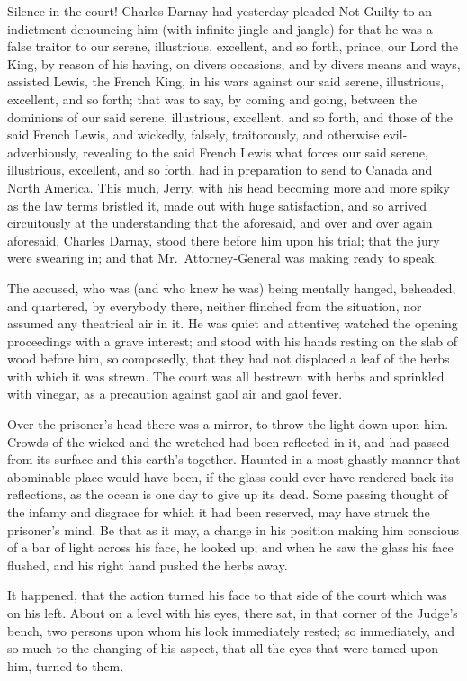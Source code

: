 Silence in the court!  Charles Darnay had yesterday pleaded Not Guilty
to an indictment denouncing him (with infinite jingle and jangle) for
that he was a false traitor to our serene, illustrious, excellent,
and so forth, prince, our Lord the King, by reason of his having, on
divers occasions, and by divers means and ways, assisted Lewis, the
French King, in his wars against our said serene, illustrious,
excellent, and so forth; that was to say, by coming and going,
between the dominions of our said serene, illustrious, excellent, and
so forth, and those of the said French Lewis, and wickedly, falsely,
traitorously, and otherwise evil-adverbiously, revealing to the said
French Lewis what forces our said serene, illustrious, excellent, and
so forth, had in preparation to send to Canada and North America.
This much, Jerry, with his head becoming more and more spiky as the
law terms bristled it, made out with huge satisfaction, and so
arrived circuitously at the understanding that the aforesaid, and
over and over again aforesaid, Charles Darnay, stood there before him
upon his trial; that the jury were swearing in; and that
Mr.\ Attorney-General was making ready to speak.

The accused, who was (and who knew he was) being mentally hanged,
beheaded, and quartered, by everybody there, neither flinched from
the situation, nor assumed any theatrical air in it.  He was quiet
and attentive; watched the opening proceedings with a grave interest;
and stood with his hands resting on the slab of wood before him, so
composedly, that they had not displaced a leaf of the herbs with
which it was strewn.  The court was all bestrewn with herbs and
sprinkled with vinegar, as a precaution against gaol air and gaol
fever.

Over the prisoner's head there was a mirror, to throw the light down
upon him.  Crowds of the wicked and the wretched had been reflected
in it, and had passed from its surface and this earth's together.
Haunted in a most ghastly manner that abominable place would have
been, if the glass could ever have rendered back its reflections, as
the ocean is one day to give up its dead.  Some passing thought of
the infamy and disgrace for which it had been reserved, may have
struck the prisoner's mind.  Be that as it may, a change in his
position making him conscious of a bar of light across his face, he
looked up; and when he saw the glass his face flushed, and his right
hand pushed the herbs away.

It happened, that the action turned his face to that side of the
court which was on his left.  About on a level with his eyes, there
sat, in that corner of the Judge's bench, two persons upon whom his look
immediately rested; so immediately, and so much to the changing of his aspect,
that all the eyes that were tamed upon him, turned to them.

